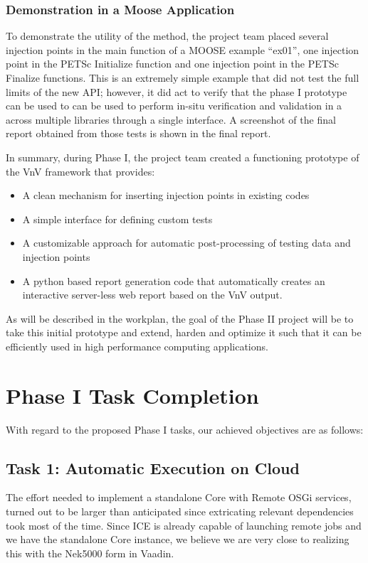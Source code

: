 \subsubsection{ Demonstration in a Moose Application } 
To demonstrate the utility of the method, the project team placed several injection points 
in the main function of a MOOSE example ``ex01'', one injection point in the PETSc Initialize function and 
one injection point in the PETSc Finalize functions. This is an extremely simple example that 
did not test the full limits of the new API; however, it did act to verify that the phase I prototype 
can be used to can be used to perform in-situ verification and validation in a across multiple libraries 
through a single interface. A screenshot of the final \VV report obtained from those tests is shown in the 
final report. 

In summary, during Phase I, the project team created a functioning prototype of the VnV framework that provides:
\begin{itemize}
 \item A clean mechanism for inserting injection points in existing codes
 \item A simple interface for defining custom tests 
 \item A customizable approach for automatic post-processing of testing data and injection points
 \item A python based report generation code that automatically creates an interactive server-less web report based on the VnV output.
\end{itemize}

As will be described in the workplan, the goal of the Phase II project will be to take this initial prototype and extend, harden and 
optimize it such that it can be efficiently used in high performance computing applications. 







\section{Phase I Task Completion}
With regard to the proposed Phase I tasks, our achieved objectives are as 
follows:

\subsection{Task 1: Automatic Execution on Cloud}
The effort needed to implement a standalone Core with Remote OSGi services, 
turned out to be larger than anticipated since extricating relevant 
dependencies took most of the time. Since ICE is already capable of launching 
remote jobs and we have the standalone Core instance, we believe we are very 
close to realizing this with the Nek5000 form in Vaadin.

